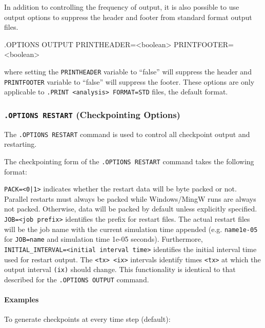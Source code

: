 In addition to controlling the frequency of output, it is also possible to use
output options to suppress the header and footer from standard format output files.
\begin{vquote}
.OPTIONS OUTPUT PRINTHEADER=<boolean> PRINTFOOTER=<boolean>
\end{vquote}
where setting the \texttt{PRINTHEADER} variable to ``false'' will suppress the header and 
\texttt{PRINTFOOTER} variable to ``false'' will suppress the footer.  These options are
only applicable to \texttt{.PRINT <analysis> FORMAT=STD} files, the default format.

\subsubsection{\texttt{.OPTIONS RESTART} (Checkpointing Options)}

The   \verb+.OPTIONS RESTART+ command is
used to control all  checkpoint output and restarting.

The checkpointing form of the \texttt{.OPTIONS RESTART} command takes the following format:

\texttt{PACK=<0|1>} indicates whether the restart data will be byte packed
or not.  Parallel restarts must always be packed while Windows/MingW
runs are always not packed.  Otherwise, data will be packed by default unless
explicitly specified.
\texttt{JOB=<job prefix>} identifies the prefix for restart files.  The
actual restart files will be the job name with the current simulation time
appended (e.g. \texttt{name1e-05} for \texttt{JOB=name} and simulation time
1e-05 seconds).  Furthermore, \texttt{INITIAL\_INTERVAL=<initial interval
  time>} identifies the initial interval time used for restart output.  The
\texttt{<tx> <ix>} intervals identify times \texttt{<tx>} at which the output
interval \texttt{(ix)} should change.  This functionality is identical to
that described for the \texttt{.OPTIONS OUTPUT} command.

\paragraph{Examples}

To generate checkpoints at every time step (default):

